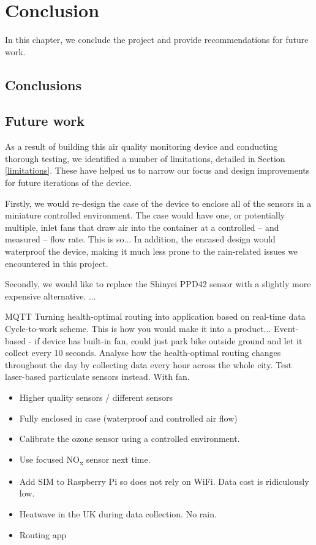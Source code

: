 \documentclass[11pt,twosided,a4paper]{report}
\begin{document}
\chapter{Conclusion} \label{chap:conclusion}

In this chapter, we conclude the project and provide recommendations for future work.

\section{Conclusions}

\section{Future work}

As a result of building this air quality monitoring device and conducting thorough testing, we identified a number of limitations, detailed in Section \ref{limitations}. These have helped us to narrow our focus and design improvements for future iterations of the device.

Firstly, we would re-design the case of the device to enclose all of the sensors in a miniature controlled environment. The case would have one, or potentially multiple, inlet fans that draw air into the container at a controlled -- and measured -- flow rate. This is so... In addition, the encased design would waterproof the device, making it much less prone to the rain-related issues we encountered in this project.

Secondly, we would like to replace the Shinyei PPD42 sensor with a slightly more expensive alternative. ...

MQTT
Turning health-optimal routing into application based on real-time data
Cycle-to-work scheme.
This is how you would make it into a product...
Event-based - if device has built-in fan, could just park bike outside ground and let it collect every 10 seconds.
Analyse how the health-optimal routing changes throughout the day by collecting data every hour across the whole city.
Test laser-based particulate sensors instead. With fan.


\begin{itemize}
\item Higher quality sensors / different sensors
\item Fully enclosed in case (waterproof and controlled air flow)
\item Calibrate the ozone sensor using a controlled environment.
\item Use focused NO\textsubscript{x} sensor next time.
\item Add SIM to Raspberry Pi so does not rely on WiFi. Data cost is ridiculously low.
\item Heatwave in the UK during data collection. No rain.
\item Routing app
\end{itemize}
\end{document}
